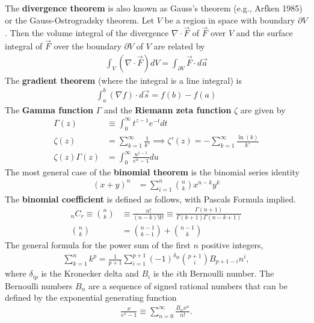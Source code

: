 The \textbf{divergence theorem} is also known as Gauss's theorem (e.g., Arfken 1985) or the Gauss-Ostrogradsky theorem. Let $V$	 be a region in space with boundary $\partial V$. Then the volume integral of the divergence $\nabla \cdot \vec{F}$ of $\vec{F}$ over $V$ and the surface integral of $\vec{F}$ over the boundary $\partial V$ of $V$ are related by 
\begin{align}
	\int_V (\nabla \cdot \vec{F}) dV = \int_{\partial V}\vec{F} \cdot d\vec{a}
\end{align}
The \textbf{gradient theorem} (where the integral is a line integral) is
\begin{align}
	\int_a^b (\nabla f) \cdot d\vec{s} = f(b)-f(a)
\end{align}
The \textbf{Gamma function} $\Gamma$ and the \textbf{Riemann zeta function} $\zeta$ are given by
\begin{align}
\Gamma(z) &\equiv\int_{0}^{\infty}t^{z-1}e^{-t}dt \\
\zeta(z)&=\sum_{k=1}^{\infty}\frac{1}{k^z}\implies \zeta'(z)=-\sum_{k=1}^{\infty}\frac{\ln(k)}{k^z} \\
\zeta(z)\Gamma(z)&=\int_{0}^{\infty}\frac{u^{z-1}}{e^u-1}du
\end{align}
The most general case of the \textbf{binomial theorem}  is the binomial series identity 
\begin{align}
(x+y)^n &= \sum_{i=1}^{n} {{n}\choose{k}}x^{n-k}y^{k}
\end{align}
The \textbf{binomial coefficient} is defined as follows, with Pascals Formula implied.
\begin{align}
_nC_r\equiv{{n}\choose{k}} &\equiv \frac{n!}{(n-k)!k!} \equiv \frac{\Gamma(n+1)}{\Gamma(k+1)\Gamma(n-k+1)} \\
{{n}\choose{k}}&={{n-1}\choose{k-1}}+{{n-1}\choose{k}}
\end{align}
The general formula for the power sum of the first $n$ positive integers, 
\begin{align}
\sum_{k=1}^{n}k^p=\frac{1}{p+1}\sum_{i=1}^{p+1}(-1)^{\delta_{ip}}{{p+1}\choose{i}}B_{p+1-i}n^i,
\end{align}
where $\delta_{ip}$ is the Kronecker delta  and $B_i$ is the $i$th Bernoulli number. The Bernoulli numbers $B_n$ are a sequence of signed rational numbers that can be defined by the exponential generating function 
\begin{align}
\frac{x}{e^x-1}\equiv\sum_{n=0}^{\infty}\frac{B_nx^n}{n!}.
\end{align}
